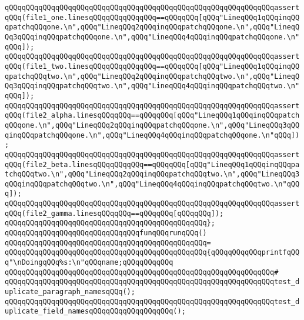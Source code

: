 \verb|qQQqqQQqqQQqqQQqqQQqqQQqqQQqqQQqqQQqqQQqqQQqqQQqqQQqqQQqqQQqqQQqassertqQQq(file1_one.linesqQQqqQQqqQQqqQQq==qQQqqQQq[qQQq"LineqQQq1qQQqinqQQqpatchqQQqone.\n",qQQq"LineqQQq2qQQqinqQQqpatchqQQqone.\n",qQQq"LineqQQq3qQQqinqQQqpatchqQQqone.\n",qQQq"LineqQQq4qQQqinqQQqpatchqQQqone.\n"qQQq]);|\newline
\verb|qQQqqQQqqQQqqQQqqQQqqQQqqQQqqQQqqQQqqQQqqQQqqQQqqQQqqQQqqQQqqQQqassertqQQq(file1_two.linesqQQqqQQqqQQqqQQq==qQQqqQQq[qQQq"LineqQQq1qQQqinqQQqpatchqQQqtwo.\n",qQQq"LineqQQq2qQQqinqQQqpatchqQQqtwo.\n",qQQq"LineqQQq3qQQqinqQQqpatchqQQqtwo.\n",qQQq"LineqQQq4qQQqinqQQqpatchqQQqtwo.\n"qQQq]);|\newline
\newline
\verb|qQQqqQQqqQQqqQQqqQQqqQQqqQQqqQQqqQQqqQQqqQQqqQQqqQQqqQQqqQQqqQQqassertqQQq(file2_alpha.linesqQQqqQQq==qQQqqQQq[qQQq"LineqQQq1qQQqinqQQqpatchqQQqone.\n",qQQq"LineqQQq2qQQqinqQQqpatchqQQqone.\n",qQQq"LineqQQq3qQQqinqQQqpatchqQQqone.\n",qQQq"LineqQQq4qQQqinqQQqpatchqQQqone.\n"qQQq]);|\newline
\verb|qQQqqQQqqQQqqQQqqQQqqQQqqQQqqQQqqQQqqQQqqQQqqQQqqQQqqQQqqQQqqQQqassertqQQq(file2_beta.linesqQQqqQQqqQQq==qQQqqQQq[qQQq"LineqQQq1qQQqinqQQqpatchqQQqtwo.\n",qQQq"LineqQQq2qQQqinqQQqpatchqQQqtwo.\n",qQQq"LineqQQq3qQQqinqQQqpatchqQQqtwo.\n",qQQq"LineqQQq4qQQqinqQQqpatchqQQqtwo.\n"qQQq]);|\newline
\verb|qQQqqQQqqQQqqQQqqQQqqQQqqQQqqQQqqQQqqQQqqQQqqQQqqQQqqQQqqQQqqQQqassertqQQq(file2_gamma.linesqQQqqQQq==qQQqqQQq[qQQqqQQq]);|\newline
\verb|qQQqqQQqqQQqqQQqqQQqqQQqqQQqqQQqqQQqqQQqqQQqqQQq};|\newline
\newline
\newline
\verb|qQQqqQQqqQQqqQQqqQQqqQQqqQQqqQQqfunqQQqrunqQQq()|\newline
\verb|qQQqqQQqqQQqqQQqqQQqqQQqqQQqqQQqqQQqqQQqqQQqqQQq=|\newline
\verb|qQQqqQQqqQQqqQQqqQQqqQQqqQQqqQQqqQQqqQQqqQQqqQQq{qQQqqQQqqQQqprintfqQQq"\nDoingqQQq%s:\n"qQQqname;qQQqqQQqqQQq|\newline
\verb|qQQqqQQqqQQqqQQqqQQqqQQqqQQqqQQqqQQqqQQqqQQqqQQqqQQqqQQqqQQqqQQq#|\newline
\verb|qQQqqQQqqQQqqQQqqQQqqQQqqQQqqQQqqQQqqQQqqQQqqQQqqQQqqQQqqQQqqQQqtest_duplicate_paragraph_namesqQQq();|\newline
\verb|qQQqqQQqqQQqqQQqqQQqqQQqqQQqqQQqqQQqqQQqqQQqqQQqqQQqqQQqqQQqqQQqtest_duplicate_field_namesqQQqqQQqqQQqqQQqqQQq();|\newline
